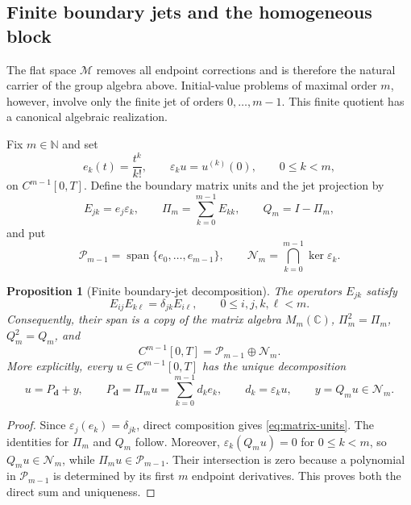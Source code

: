 \documentclass[11pt]{article}
\numberwithin{equation}{section}
\newtheorem{proposition}{Proposition}
\theoremstyle{definition}
\theoremstyle{remark}
\newcommand{\C}{\mathbb C}
\newcommand{\N}{\mathbb N}
\newcommand{\M}{\mathcal M}
\newcommand{\Span}{\operatorname{span}}
\begin{document}
\subsection{Finite boundary jets and the homogeneous block}

The flat space $\M$ removes all endpoint corrections and is therefore the natural carrier of the group algebra above. Initial-value problems of maximal order $m$, however, involve only the finite jet of orders $0,\ldots,m-1$. This finite quotient has a canonical algebraic realization.

Fix $m\in\N$ and set
\begin{equation*}
e_k(t)=\frac{t^k}{k!},
\qquad
\varepsilon_k u=u^{(k)}(0),
\qquad 0\le k<m,
\end{equation*}
on $C^{m-1}[0,T]$. Define the boundary matrix units and the jet projection by
\begin{equation}
E_{jk}=e_j\varepsilon_k,
\qquad
\Pi_m=\sum_{k=0}^{m-1}E_{kk},
\qquad
Q_m=I-\Pi_m,
\label{eq:jet-projectors}
\end{equation}
and put
\begin{equation*}
\mathcal P_{m-1}=\Span\{e_0,\ldots,e_{m-1}\},
\qquad
\mathcal N_m=\bigcap_{k=0}^{m-1}\ker\varepsilon_k.
\end{equation*}

\begin{proposition}[Finite boundary-jet decomposition]\label{prop:boundary-jets}
The operators $E_{jk}$ satisfy
\begin{equation}
E_{ij}E_{k\ell}=\delta_{jk}E_{i\ell},
\qquad 0\le i,j,k,\ell<m.
\label{eq:matrix-units}
\end{equation}
Consequently, their span is a copy of the matrix algebra $M_m(\C)$, $\Pi_m^2=\Pi_m$, $Q_m^2=Q_m$, and
\begin{equation*}
C^{m-1}[0,T]=\mathcal P_{m-1}\oplus\mathcal N_m.
\end{equation*}
More explicitly, every $u\in C^{m-1}[0,T]$ has the unique decomposition
\begin{equation*}
u=P_{\mathbf d}+y,
\qquad
P_{\mathbf d}=\Pi_m u=\sum_{k=0}^{m-1}d_ke_k,
\qquad
d_k=\varepsilon_k u,
\qquad
y=Q_mu\in\mathcal N_m.
\end{equation*}
\end{proposition}

\begin{proof}
Since $\varepsilon_j(e_k)=\delta_{jk}$, direct composition gives \eqref{eq:matrix-units}. The identities for $\Pi_m$ and $Q_m$ follow. Moreover, $\varepsilon_k(Q_mu)=0$ for $0\le k<m$, so $Q_mu\in\mathcal N_m$, while $\Pi_mu\in\mathcal P_{m-1}$. Their intersection is zero because a polynomial in $\mathcal P_{m-1}$ is determined by its first $m$ endpoint derivatives. This proves both the direct sum and uniqueness.
\end{proof}
\end{document}
